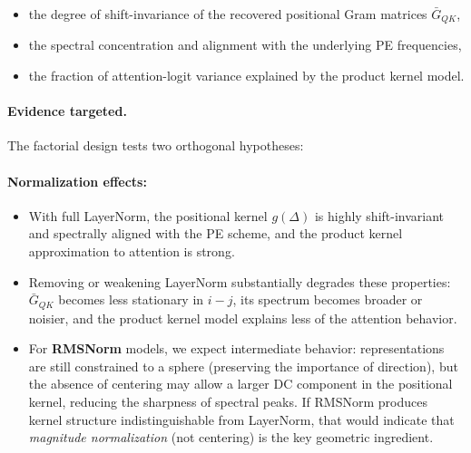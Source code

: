 \documentclass[11pt]{article}
\theoremstyle{definition}
\begin{document}
\begin{itemize}
    \item the degree of shift-invariance of the recovered positional Gram matrices \(\bar{G}_{QK}\),
    \item the spectral concentration and alignment with the underlying PE frequencies,
    \item the fraction of attention-logit variance explained by the product kernel model.
\end{itemize}

\paragraph{Evidence targeted.}
The factorial design tests two orthogonal hypotheses:

\paragraph{Normalization effects:}
\begin{itemize}
    \item With full LayerNorm, the positional kernel \(g(\Delta)\) is highly shift-invariant and spectrally aligned with the PE scheme, and the product kernel approximation to attention is strong.
    \item Removing or weakening LayerNorm substantially degrades these properties: \(\bar{G}_{QK}\) becomes less stationary in \(i-j\), its spectrum becomes broader or noisier, and the product kernel model explains less of the attention behavior.
    \item For \textbf{RMSNorm} models, we expect intermediate behavior: representations are still constrained to a sphere (preserving the importance of direction), but the absence of centering may allow a larger DC component in the positional kernel, reducing the sharpness of spectral peaks. If RMSNorm produces kernel structure indistinguishable from LayerNorm, that would indicate that \emph{magnitude normalization} (not centering) is the key geometric ingredient.
\end{itemize}
\end{document}
